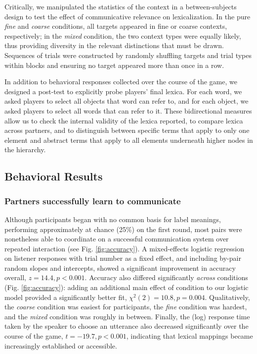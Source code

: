 \documentclass[10pt,letterpaper]{article}
\begin{document}
Critically, we manipulated the statistics of the context in a between-subjects design to test the effect of communicative relevance on lexicalization. In the pure \emph{fine} and \emph{coarse} conditions, all targets appeared in fine or coarse contexts, respectively; in the \emph{mixed} condition, the two context types were equally likely, thus providing diversity in the relevant distinctions that must be drawn. Sequences of trials were constructed by randomly shuffling targets and trial types within blocks and ensuring no target appeared more than once in a row. 

In addition to behavioral responses collected over the course of the game, we designed a post-test to explicitly probe players' final lexica. For each word, we asked players to select all objects that word can refer to, and for each object, we asked players to select all words that can refer to it. These bidirectional measures allow us to check the internal validity of the lexica reported, to compare lexica across partners, and to distinguish between specific terms that apply to only one element and abstract terms that apply to all elements underneath higher nodes in the hierarchy. 

\subsection{Behavioral Results}

\subsubsection{Partners successfully learn to communicate}

Although participants began with no common basis for label meanings, performing approximately at chance (25\%) on the first round, most pairs were nonetheless able to coordinate on a successful communication system over repeated interaction (see Fig. \ref{fig:accuracy}). 
A mixed-effects logistic regression on listener responses with trial number as a fixed effect, and including by-pair random slopes and intercepts, showed a significant improvement in accuracy overall, $z = 14.4, p < 0.001$. 
Accuracy also differed significantly \emph{across} conditions (Fig. \ref{fig:accuracy}): adding an additional main effect of condition to our logistic model provided a significantly better fit, $\chi^2(2) = 10.8, p = 0.004$. Qualitatively, the \emph{coarse} condition was easiest for participants, the \emph{fine} condition was hardest, and the \emph{mixed} condition was roughly in between. %
Finally, the (log) response time taken by the speaker to choose an utterance also decreased significantly over the course of the game, $t = -19.7, p < 0.001$, indicating that lexical mappings became increasingly established or accessible.
\end{document}
